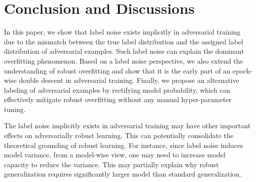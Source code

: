 \section{Conclusion and Discussions}
\label{sect:conclusion}


In this paper, we show that label noise exists implicitly in adversarial training due to the mismatch between the true label distribution and the assigned label distribution of adversarial examples. Such label noise can explain the dominant overfitting phenomenon. Based on a label noise perspective, we also extend the understanding of robust overfitting and show that it is the early part of an epoch-wise double descent in adversarial training. Finally, we propose an alternative labeling of adversarial examples by rectifying model probability, which can effectively mitigate robust overfitting without any manual hyper-parameter tuning. 

The label noise implicitly exists in adversarial training may have other important effects on adversarially robust learning. This can potentially consolidate the theoretical grounding of robust learning. For instance, since label noise induces model variance, from a model-wise view, one may need to increase model capacity to reduce the variance. This may partially explain why robust generalization requires significantly larger model than standard generalization. 



